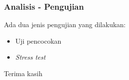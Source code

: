 \documentclass{beamer}
\begin{document}

\begin{frame}
\frametitle{Analisis - Pengujian}
Ada dua jenis pengujian yang dilakukan:
\begin{itemize}
  \item Uji pencocokan
  \item \emph{Stress test}
\end{itemize}
\end{frame}




\begin{frame}
\Huge{\centerline{Terima kasih}}
\end{frame}

\end{document}
